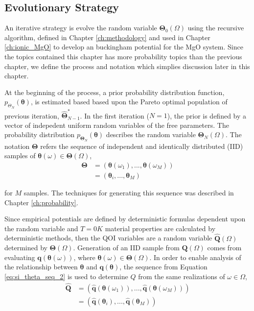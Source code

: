 \subsection{Evolutionary Strategy}

An iterative strategy is evolve the random variable $\bm{\Theta}_0(\Omega)$ using the recursive algorithm, defined in Chapter \ref{ch:methodology} and used in Chapter \ref{ch:ionic_MgO} to develop an buckingham potential for the MgO system.  Since the topics contained this chapter has more probability topics than the previous chapter, we define the process and notation which simplies discussion later in this chapter.

At the beginning of the process, a prior probability distribution function, $p_{\Theta_N}(\bm{\theta})$, is estimated based based upon the Pareto optimal population of previous iteration,
$\hat{\bm{\Theta}}_{N-1}^*$.
In the first iteration ($N=1$), the prior is defined by a vector of indepedent uniform random variables of the free parameters.
The probability distribution $p_{\bm{\Theta}_N}(\bm{\theta})$ describes the random variable $\bm{\Theta}_{N}(\Omega)$.
The notation $\bm{\Theta}$ refers the sequence of independent and identically distributed (IID) samples of $\bm{\theta}(\omega) \in \bm{\Theta}(\Omega)$,
\begin{subequations}
  \begin{align}
     \bm{\Theta}
       &= (\bm{\theta}(\omega_1), ...,\bm{\theta}(\omega_M))
	  \label{eq:si_theta_seq_1} \\
       &= (\bm{\theta}_i,...,\bm{\theta}_M)
	  \label{eq:si_theta_seq_2}
  \end{align}
\end{subequations}

for $M$ samples.
The techniques for generating this sequence was described in Chapter \ref{ch:probability}.

Since empirical potentials are defined by deterministic formulas dependent upon the random variable and $T=0K$ material properties are calculated by deterministic methods, then the QOI variables are a random variable $\hat{\bm{Q}}(\Omega)$ determined by $\bm{\Theta}(\Omega)$.
Generation of an IID sample from $\bm{Q}(\Omega)$ comes from evaluating $\bm{q}(\bm{\theta}(\omega))$, where $\bm{\theta}(\omega) \in \bm{\Theta}(\Omega)$.
In order to enable analysis of the relationship between $\bm{\theta}$ and $\bm{q}(\bm{\theta})$, the sequence from Equation \ref{eq:si_theta_seq_2} is used to determine $Q$ from the same realizations of $\omega \in \Omega$,
\begin{subequations}
  \begin{align}
     \hat{\bm{Q}}
       &= (\hat{\bm{q}}(\bm{\theta}(\omega_1)),
           ...,
           \hat{\bm{q}}(\bm{\theta}(\omega_M))
          )
      \label{eq:si_qoi_seq_1} \\
       &= (\hat{\bm{q}}(\bm{\theta}_i),
           ...,
           \hat{\bm{q}}(\bm{\theta}_M)
          )
      \label{eq:si_qoi_seq_2}
  \end{align}
\end{subequations}

